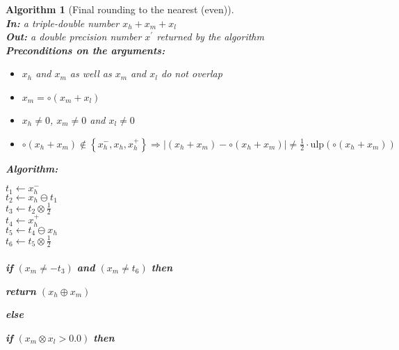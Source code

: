 \documentclass[a4paper,10pt,twoside]{article}
\newtheorem{algorithm}[theorem]{Algorithm}
\newcommand{\hi}{\ensuremath{\mathit{h}}}
\newcommand{\mi}{\ensuremath{\mathit{m}}}
\newcommand{\lo}{\ensuremath{\mathit{l}}}
\newcommand{\mUlp}{\ensuremath{\mathrm{ulp}}}
\begin{document}
\begin{algorithm}[Final rounding to the nearest (even)] \label{algarrpres} ~ \\
{\bf In:} a triple-double number $x_\hi + x_\mi + x_\lo$ \\
{\bf Out:} a double precision number $x^\prime$ returned by the algorithm \\
{\bf Preconditions on the arguments:}
\begin{itemize}
\item $x_\hi$ and $x_\mi$ as well as $x_\mi$ and $x_\lo$ do not overlap
\item $x_\mi = \circ \left( x_\mi + x_\lo \right)$
\item $x_\hi \not = 0$, $x_\mi \not = 0$ and $x_\lo \not = 0$
\item $\circ \left( x_\hi + x_\mi \right) \not \in \left \lbrace x_\hi^-, x_\hi, x_\hi^+ \right \rbrace \Rightarrow
\left \vert \left( x_\hi + x_\mi \right) - \circ\left( x_\hi + x_\mi \right) \right \vert \not =
\frac{1}{2} \cdot \mUlp\left( \circ \left( x_\hi + x_\mi \right) \right)$
\end{itemize}
{\bf Algorithm:} \\
\begin{center}
\begin{minipage}[b]{80mm}
$t_1 \gets x_\hi^-$ \\
$t_2 \gets x_\hi \ominus t_1$ \\
$t_3 \gets t_2 \otimes \frac{1}{2}$ \\
$t_4 \gets x_\hi^+$ \\
$t_5 \gets t_4 \ominus x_\hi$ \\
$t_6 \gets t_5 \otimes \frac{1}{2}$
\\ ~ \\
{\bf if} $\left( x_\mi \not = -t_3 \right)$ {\bf and} $\left( x_\mi \not = t_6 \right)$ {\bf then}
\vspace{-2.4mm}
\begin{center}
\begin{minipage}[b]{70mm}
\vspace{-2.4mm}
{\bf return } $\left( x_\hi \oplus x_\mi \right)$
\end{minipage}
\end{center}
\vspace{-2.4mm}
{\bf else}
\vspace{-2.4mm}
\begin{center}
\begin{minipage}[b]{70mm}
{\bf if} $\left( x_\mi \otimes x_\lo > 0.0 \right)$ {\bf then}

\end{minipage}
\end{center}
\end{minipage}
\end{center}
\end{algorithm}
\end{document}
